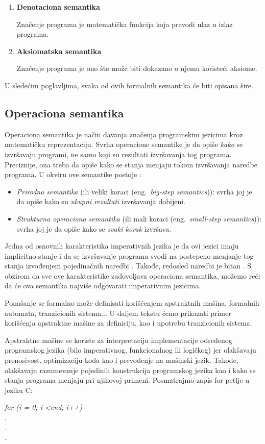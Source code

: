 \documentclass[a4paper]{article}
\begin{document}
{\begin{enumerate}
  Značenje programa predstavlja tok koraka izvršavanja programa sa datim ulazom.
  \item \textbf{Denotaciona semantika}

  Značenje programa je matematička funkcija koja prevodi ulaz u izlaz programa.
  \item \textbf{Aksiomatska semantika}

  Značenje programa je ono što može biti dokazano o njemu koristeći aksiome.
\end{enumerate}

U sledećim poglavljima, svaka od ovih formalnih semantika će biti opisana šire.
\subsection{Operaciona semantika}
\label{sec:opsem}

\qquad Operaciona semantika je način davanja značenja programskim jezicima kroz matematičku reprezentaciju. Svrha operacione semantike je da opiše \textit{kako} se izvršavaju programi, ne samo koji su rezultati izvršavanja tog programa. Preciznije, ona treba da opiše kako se stanja menjaju tokom izvršavanja naredbe programa. U okviru ove semantike postoje  \cite{wiley}:
\begin{itemize}
	\item \textit{Prirodna semantika} (ili veliki koraci (eng.~{\em big-step semantics})): svrha joj je da opiše kako su \textit{ukupni rezultati} izvršavanja dobijeni.
	\item \textit{Strukturna operaciona semantika} (ili mali koraci (eng.~{\em small-step semantics})): svrha joj je da opiše kako se \textit{svaki korak} izvršava.
\end{itemize}

Jedna od osnovnih karakteristika imperativnih jezika je da ovi jezici imaju implicitno stanje i da se izvršavanje programa svodi na postepeno menjanje tog stanja izvođenjem pojedinačnih naredbi \cite{milena2}. Takođe, redosled naredbi je bitan \cite{milena2}. S obzirom da sve ove karakteristike zadovoljava operaciona semantika, možemo reći da će ova semantika najviše odgovarati imperativnim jezicima. 


Ponašanje se formalno može definisati korišćenjem apstraktnih mašina, formalnih automata, tranzicionih sistema... U daljem tekstu ćemo prikazati primer korišćenja apstraktne mašine za definiciju, kao i upotrebu tranzicionih sistema.

Apstraktne mašine se koriste za interpretaciju implementacije određenog programskog jezika (bilo imperativnog, funkcionalnog ili logičkog) jer olakšavaju prenosivost, optimizaciju koda kao i prevođenje na mašinski jezik. Takođe, olakšavaju razumevanje pojedinih konstrukcija programskog jezika kao i kako se stanja programa menjaju pri njihovoj primeni. Posmatrajmo zapis for petlje u jeziku C: 
\begin{center}\textit{for (i = 0; i \textless end; i++)}
\\.
\\.
\\.
\end{center}
\hfill \break

}
\end{document}
